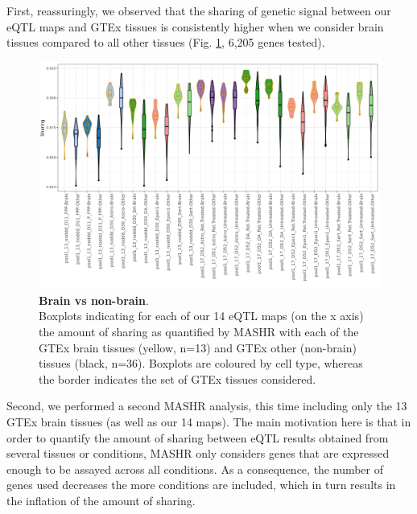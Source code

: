 First, reassuringly, we observed that the sharing of genetic signal between our eQTL maps and GTEx tissues is consistently higher when we consider brain tissues compared to all other tissues (Fig. \ref{fig:neuroseq_and_gtex_brain_specificity}, 6,205 genes tested). 
\\

\begin{figure}[h]
\centering
\includegraphics[width=16cm]{Chapter5/Fig/neuroseq_gtex_brain_nonbrain_boxplots.png}
\caption[Brain vs non-brain]{\textbf{Brain vs non-brain}.\\
Boxplots indicating for each of our 14 eQTL maps (on the x axis) the amount of sharing as quantified by MASHR \cite{urbut2019flexible} with each of the GTEx brain tissues (yellow, n=13) and GTEx other (non-brain) tissues (black, n=36).
Boxplots are coloured by cell type, whereas the border indicates the set of GTEx tissues considered.}
\label{fig:neuroseq_and_gtex_brain_specificity}
\end{figure}

\newpage

Second, we performed a second MASHR analysis, this time including only the 13 GTEx brain tissues (as well as our 14 maps).
The main motivation here is that in order to quantify the amount of sharing between eQTL results obtained from several tissues or conditions, MASHR only considers 
genes that are expressed enough to be assayed across all conditions.
As a consequence, the number of genes used decreases the more conditions are included, which in turn results in the inflation of the amount of sharing.\\


